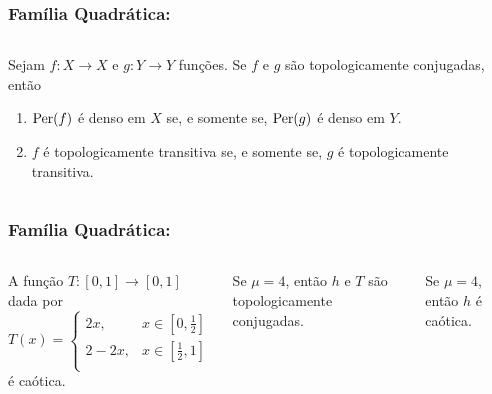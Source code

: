 \begin{frame}
\vspace{5pt}
\frametitle{Família Quadrática: \subsecname}
\begin{columns}
\column{\dimexpr\paperwidth-15pt}

\begin{proposition}
Sejam $f: X \to X$ e $g: Y \to Y$ funções. Se $f$ e $g$ são topologicamente conjugadas, então
\begin{enumerate}
\item $\operatorname{Per}(f)$ é denso em $X$ se, e somente se, $\operatorname{Per}(g)$ é denso em $Y$.
\item $f$ é topologicamente transitiva se, e somente se, $g$ é topologicamente transitiva.
\end{enumerate}
\end{proposition}

\end{columns}
\end{frame}


\begin{frame}
\vspace{5pt}
\frametitle{Família Quadrática: \subsecname}
\begin{columns}
\column{\dimexpr\paperwidth-15pt}

\begin{lemma}
A função $T: [0,1] \to [0,1]$ dada por
\[ T(x) =
  \begin{cases}
    2x, & x \in \left[ 0, \frac{1}{2} \right] \\
    2 - 2x, & x \in \left[ \frac{1}{2}, 1 \right] \\
  \end{cases}
\]
é caótica.
\end{lemma}

\vspace{10pt}

\begin{theorem}
Se $\mu = 4$, então $h$ e $T$ são topologicamente conjugadas.
\end{theorem}

\vspace{10pt}

\begin{corollary}
Se $\mu = 4$, então $h$ é caótica.
\end{corollary}

\end{columns}
\end{frame}

